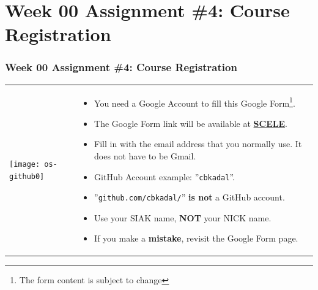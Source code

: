 \documentclass[xcolor=table, notheorems, hyperref={pdfpagelabels=false}]{beamer}
\begin{document}
\section{Week 00 Assignment \#4: Course Registration}
\begin{frame}[fragile]
\frametitle{Week 00 Assignment \#4: Course Registration}

\begin{tabular}{ll}
\begin{minipage}[t]{104pt}\vspace{1pt}%

\texttt{[image: os-github0]}

\end{minipage}%
&
\begin{minipage}[t]{224pt}\vspace{1pt}%

\begin{itemize}

\item You need a Google Account to fill this Google Form\footnote{The form content is subject to change}.

\item The Google Form link will be available at
\href{https://scele.cs.ui.ac.id/mod/forum/discuss.php?d=30285}{\textbf{SCELE}}.

\item Fill in with the email address that you normally use. It does not have to be Gmail.

\item GitHub Account example: ''\texttt{cbkadal}''.

\item ''\texttt{github.com/cbkadal/}'' \textbf{is not} a GitHub account.

\item Use your SIAK name, \textbf{NOT} your NICK name.

\item If you make a \textbf{mistake}, revisit the Google Form page.

\end{itemize}

\end{minipage}%
\\
\end{tabular}

\end{frame}

\end{document}
